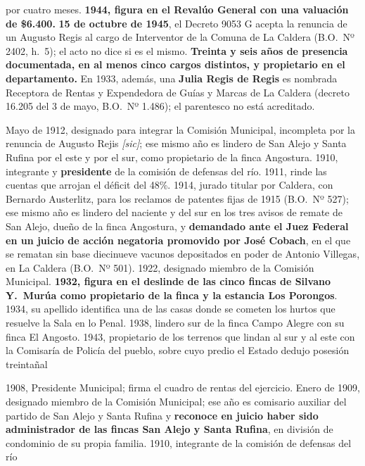 \begin{personas}
por cuatro meses. \textbf{1944, figura en el Revalúo General con una valuación de \$6.400.} \textbf{15 de octubre de 1945}, el Decreto 9053 G acepta la renuncia de un Augusto Regis al cargo de Interventor de la Comuna de La Caldera (B.O.\ Nº 2402, h.\ 5); el acto no dice si es el mismo. \textbf{Treinta y seis años de presencia documentada, en al menos cinco cargos distintos, y propietario en el departamento.} En 1933, además, una \textbf{Julia Regis de Regis} es nombrada Receptora de Rentas y Expendedora de Guías y Marcas de La Caldera (decreto 16.205 del 3 de mayo, B.O.\ Nº 1.486); el parentesco no está acreditado.

\item[{\textbf{Daniel Linares\index{Linares, Daniel}}}] Mayo de 1912, designado para integrar la Comisión Municipal, incompleta por la renuncia de Augusto Rejis \textit{[sic]}; ese mismo año es lindero de San Alejo y Santa Rufina por el este y por el sur, como propietario de la finca Angostura. 1910, integrante y \textbf{presidente} de la comisión de defensas del río. 1911, rinde las cuentas que arrojan el déficit del 48\%. 1914, jurado titular por Caldera, con Bernardo Austerlitz, para los reclamos de patentes fijas de 1915 (B.O.\ Nº 527); ese mismo año es lindero del naciente y del sur en los tres avisos de remate de San Alejo, dueño de la finca Angostura, y \textbf{demandado ante el Juez Federal en un juicio de acción negatoria promovido por José Cobach}, en el que se rematan sin base diecinueve vacunos depositados en poder de Antonio Villegas, en La Caldera (B.O.\ Nº 501). 1922, designado miembro de la Comisión Municipal. \textbf{1932, figura en el deslinde de las cinco fincas de Silvano Y.\ Murúa como propietario de la finca y la estancia Los Porongos}. 1934, su apellido identifica una de las casas donde se cometen los hurtos que resuelve la Sala en lo Penal. 1938, lindero sur de la finca Campo Alegre con su finca El Angosto. 1943, propietario de los terrenos que lindan al sur y al este con la Comisaría de Policía del pueblo, sobre cuyo predio el Estado dedujo posesión treintañal

\item[{\textbf{Ángel Fernández\index{Fernández, Ángel}}}] 1908, Presidente Municipal; firma el cuadro de rentas del ejercicio. Enero de 1909, designado miembro de la Comisión Municipal; ese año es comisario auxiliar del partido de San Alejo y Santa Rufina y \textbf{reconoce en juicio haber sido administrador de las fincas San Alejo y Santa Rufina}, en división de condominio de su propia familia. 1910, integrante de la comisión de defensas del río


\end{personas}

